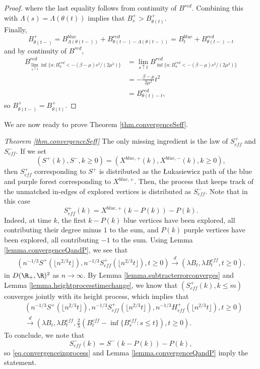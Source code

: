 \begin{proof}
where the last equality follows from continuity of $B^{red}$. Combining this with $\Lambda(s)=\Lambda(\theta(t))$ implies that
$B^+_s>B^+_{\theta(t)}$. \\
Finally, 
$$B^+_{\theta(t-)}=B^{blue}_{\Lambda(\theta(t-))}+B^{red}_{\theta(t-)-\Lambda(\theta(t-))}
=B^{blue}_{t}+B^{red}_{\theta(t-)-t}$$
and by continuity of $B^{red}$,
\begin{align*}B^{red}_{\lim_{s\uparrow t}\inf\{u:B^{red}_u<-(\beta-\mu)s^2/(2\mu^2)\}}&=\lim_{s\uparrow t} B^{red}_{\inf\{u:B^{red}_u<-(\beta-\mu)s^2/(2\mu^2)\}}\\&= -\frac{\beta-\mu}{2\mu^2}t^2\\
&=B^{red}_{\theta(t)-t}, \end{align*}
so 
$B^+_{\theta(t-)}=B^+_{\theta(t)}.$
\end{proof}

We are now ready to prove Theorem \ref{thm.convergenceSeff}.

\begin{proofof}{\emph{Theorem \ref{thm.convergenceSeff}}}
The only missing ingredient is the law of $S^+_{eff}$ and $S^-_{eff}$. If we set $$(S^+(k),S^-,k\geq 0) =(X^{blue,+}(k),X^{blue,-}(k),k\geq 0),$$
then $S^+_{eff}$ corresponding to $S^+$ is distributed as the \L ukasiewicz path of the blue and purple forest corresponding to $X^{blue,+}$. Then, the process that keeps track of the unmatched in-edges of explored vertices is distributed as $S^-_{eff}$. 
Note that in this case 
$$S^+_{eff}(k)=X^{blue,+}(k-P(k))-P(k).$$
Indeed, at time $k$, the first $k-P(k)$ blue vertices have been explored, all contributing their degree minus $1$ to the sum, and $P(k)$ purple vertices have been explored, all contributing $-1$ to the sum. Using Lemma \ref{lemma.convergenceQandP}, we see that 
\begin{align*}
    \left(n^{-1/3}S^+\left(\lfloor n^{2/3}t\rfloor\right), n^{-1/3}S^+_{eff}\left(\lfloor n^{2/3}t\rfloor\right), t\geq 0\right)\overset{d}{\to}\left(\lambda B_t, \lambda B^{eff}_t, t\geq 0\right).
\end{align*}
in $D(\R_+,\R)^2$ as $n\to \infty$. 
By Lemma \ref{lemma.subtracterrorconverges} and Lemma \ref{lemma.heightprocesstimechange}, we know that $(S^+_{eff}(k),k\leq m)$ converges jointly with its height process, which implies that 
\begin{align*}
    &\left(n^{-1/3}S^+\left(\lfloor n^{2/3}t\rfloor\right), n^{-1/3}S^+_{eff}\left(\lfloor n^{2/3}t\rfloor\right),n^{-1/3}H^+_{eff}\left(\lfloor n^{2/3}t\rfloor\right), t\geq 0\right)\\
    &\overset{d}{\to}\left(\lambda B_t, \lambda B^{eff}_t,  \frac{2}{\lambda}\left(B^{eff}_{t}-\inf\{B^{eff}_{s}:s\leq t\}\right), t\geq 0\right).
\end{align*}
To conclude, we note that 
$$S^-_{eff}(k)=S^-(k-P(k))-P(k),$$
so \eqref{eq.convergenceinprocess} and Lemma \ref{lemma.convergenceQandP} imply the statement. 

\end{proofof}

